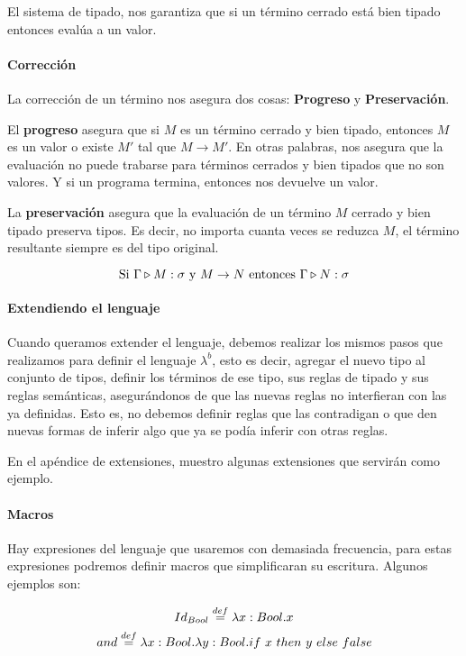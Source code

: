 El sistema de tipado, nos garantiza que si un término cerrado está bien tipado entonces evalúa a un valor.


\paragraph{Corrección}
La corrección de un término nos asegura dos cosas:	\textbf{Progreso} y \textbf{Preservación}.

El \textbf{progreso} asegura que si $M$ es un término cerrado y bien tipado, entonces $M$ es un valor o existe $M'$ tal que $M\to M'$. En otras palabras, nos asegura que la evaluación no puede trabarse para términos cerrados y bien tipados que no son valores. Y si un programa termina, entonces nos devuelve un valor.

La \textbf{preservación} asegura que la evaluación de un término $M$ cerrado y bien tipado preserva tipos. Es decir, no importa cuanta veces se reduzca $M$, el término resultante siempre es del tipo original.

$$\text{Si } \Gamma\triangleright M : \sigma \text{ y } M\to N \text{ entonces } \Gamma\triangleright N : \sigma$$	

\paragraph{Extendiendo el lenguaje}
Cuando queramos extender el lenguaje, debemos realizar los mismos pasos que realizamos para definir el lenguaje $\lambda^b$, esto es decir, agregar el nuevo tipo al conjunto de tipos, definir los términos de ese tipo, sus reglas de tipado y sus reglas semánticas, asegurándonos de que las nuevas reglas no interfieran con las ya definidas. Esto es, no debemos definir reglas que las contradigan o que den nuevas formas de inferir algo que ya se podía inferir con otras reglas.

En el apéndice de extensiones, muestro algunas extensiones que servirán como ejemplo.


\paragraph{Macros} Hay expresiones del lenguaje que usaremos con demasiada frecuencia, para estas expresiones podremos definir macros que simplificaran su escritura. Algunos ejemplos son:

$$Id_{Bool} \overset{def}{=} \lambda x: Bool . x$$
$$and \overset{def}{=} \lambda x: Bool . \lambda y: Bool . if~ x~ then~ y~ else~ false$$

